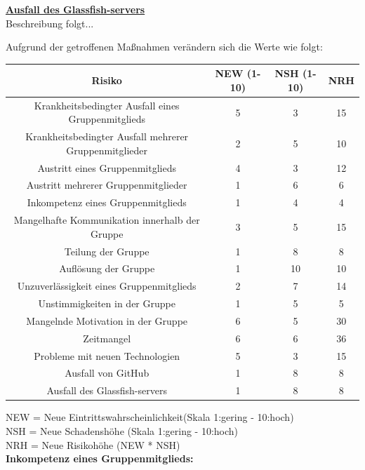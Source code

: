 \documentclass[fontsize=12pt,paper=a4,twoside]{scrartcl}
\begin{document}
\bigskip

\textbf{\underline{Ausfall des Glassfish-servers}}\\
Beschreibung folgt...\\

\bigskip 

Aufgrund der getroffenen Maßnahmen verändern sich die Werte wie folgt:\\
\begin{center}
\begin{tabular}{|c|c|c|c|} \hline
Risiko & NEW (1-10) & NSH (1-10) & NRH\\ \hline
Krankheitsbedingter Ausfall eines Gruppenmitglieds & 5 & 3 & 15\\ \hline
Krankheitsbedingter Ausfall mehrerer Gruppenmitglieder & 2 & 5 & 10\\ \hline
Austritt eines Gruppenmitglieds & 4 & 3 & 12\\ \hline
Austritt mehrerer Gruppenmitglieder & 1 & 6 & 6\\ \hline
Inkompetenz eines Gruppenmitglieds & 1 & 4 & 4\\ \hline
Mangelhafte Kommunikation innerhalb der Gruppe & 3 & 5 & 15\\ \hline
Teilung der Gruppe & 1 & 8 & 8\\ \hline
Auflösung der Gruppe & 1 & 10 & 10\\ \hline
Unzuverlässigkeit eines Gruppenmitglieds & 2 & 7 & 14\\ \hline
Unstimmigkeiten in der Gruppe & 1 & 5 & 5\\ \hline
Mangelnde Motivation in der Gruppe & 6 & 5 & 30\\ \hline
Zeitmangel & 6 & 6 & 36\\ \hline
Probleme mit neuen Technologien & 5 & 3 & 15\\ \hline
Ausfall von GitHub & 1 & 8 & 8\\ \hline
Ausfall des Glassfish-servers & 1 & 8 & 8\\ \hline
\end{tabular}
\end{center}

NEW = Neue Eintrittswahrscheinlichkeit(Skala 1:gering - 10:hoch)\\
NSH = Neue Schadenshöhe (Skala 1:gering - 10:hoch)\\
NRH = Neue Risikohöhe (NEW * NSH)\\\textbf{Inkompetenz eines Gruppenmitglieds:}\\
\end{document}
